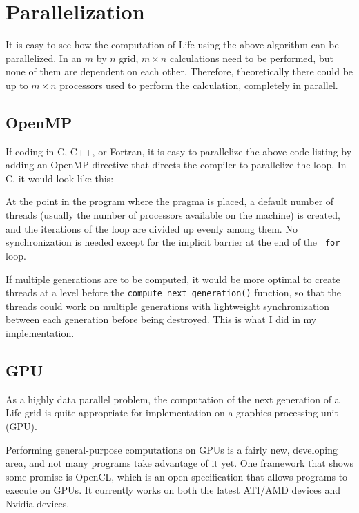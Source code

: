 \documentclass[letterpaper,12pt]{article}
\begin{document}
\section{Parallelization}

It is easy to see how the computation of Life using the above algorithm can be
parallelized.  In an $m$ by $n$ grid, $m \times n$ calculations need to be
performed, but none of them are dependent on each other.  Therefore,
theoretically there could be up to $m \times n$ processors used to perform the
calculation, completely in parallel.  

\subsection{OpenMP}

If coding in C, C++, or Fortran, it is easy to parallelize the above code
listing by adding an OpenMP directive that directs the compiler to parallelize
the loop. In C, it would look like this:



At the point in the program where the pragma is placed, a default number of
threads (usually the number of processors available on the machine) is created,
and the iterations of the loop are divided up evenly among them.  No
synchronization is needed except for the implicit barrier at the end of the {\tt
for} loop.

If multiple generations are to be computed, it would be more optimal to create
threads at a level before the {\tt compute\_next\_generation()}
function, so that the threads could work on multiple generations with
lightweight synchronization between each generation before being destroyed.
This is what I did in my implementation.

\subsection{GPU}

As a highly data parallel problem, the computation of the next generation of a
Life grid is quite appropriate for implementation on a graphics processing unit
(GPU).

Performing general-purpose computations on GPUs is a fairly new, developing
area, and not many programs take advantage of it yet.  One framework that shows
some promise is OpenCL\cite{opencl}, which is an open specification that allows programs to
execute on GPUs.  It currently works on both the latest ATI/AMD devices and
Nvidia devices. 
\end{document}
